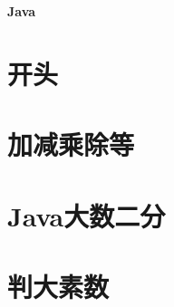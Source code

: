 \documentclass{article}
\begin{document}
\begin{titlepage}

\thispagestyle{empty}
\pagebreak
\textbf{Java}
\pagestyle{plain}
\tableofcontents



\hspace{3em}
\section{﻿开头}

\section{加减乘除等}

\section{Java大数二分}

\section{判大素数}


\end{titlepage}
\end{document}
